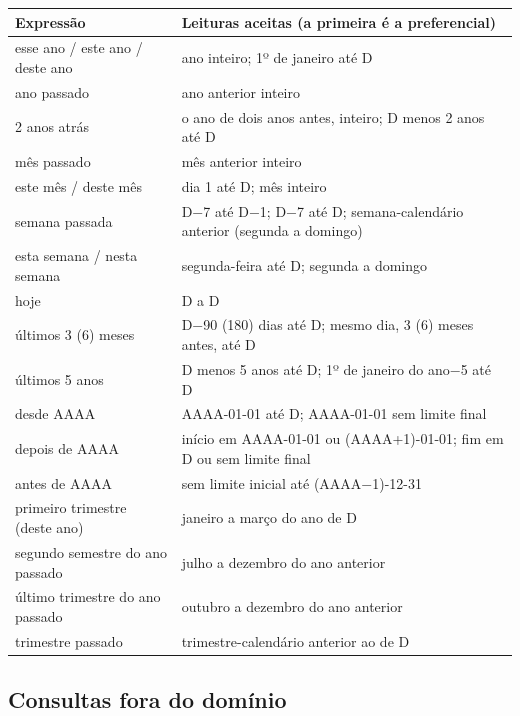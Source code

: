 \begin{quadro}[htbp!]
\centering
\caption{Leituras aceitas para as expressões de tempo relativo (D = data de referência da execução)}
\label{quadro:tempo-relativo}
\small
\begin{tabular}{|p{4.6cm}|p{9.4cm}|}
\hline
\textbf{Expressão} & \textbf{Leituras aceitas (a primeira é a preferencial)} \\
\hline
esse ano / este ano / deste ano & ano inteiro; 1º de janeiro até D \\ \hline
ano passado & ano anterior inteiro \\ \hline
2 anos atrás & o ano de dois anos antes, inteiro; D menos 2 anos até D \\ \hline
mês passado & mês anterior inteiro \\ \hline
este mês / deste mês & dia 1 até D; mês inteiro \\ \hline
semana passada & D$-$7 até D$-$1; D$-$7 até D; semana-calendário anterior (segunda a domingo) \\ \hline
esta semana / nesta semana & segunda-feira até D; segunda a domingo \\ \hline
hoje & D a D \\ \hline
últimos 3 (6) meses & D$-$90 (180) dias até D; mesmo dia, 3 (6) meses antes, até D \\ \hline
últimos 5 anos & D menos 5 anos até D; 1º de janeiro do ano$-$5 até D \\ \hline
desde AAAA & AAAA-01-01 até D; AAAA-01-01 sem limite final \\ \hline
depois de AAAA & início em AAAA-01-01 ou (AAAA+1)-01-01; fim em D ou sem limite final \\ \hline
antes de AAAA & sem limite inicial até (AAAA$-$1)-12-31 \\ \hline
primeiro trimestre (deste ano) & janeiro a março do ano de D \\ \hline
segundo semestre do ano passado & julho a dezembro do ano anterior \\ \hline
último trimestre do ano passado & outubro a dezembro do ano anterior \\ \hline
trimestre passado & trimestre-calendário anterior ao de D \\ \hline
\end{tabular}
\end{quadro}

\subsection*{Consultas fora do domínio}

